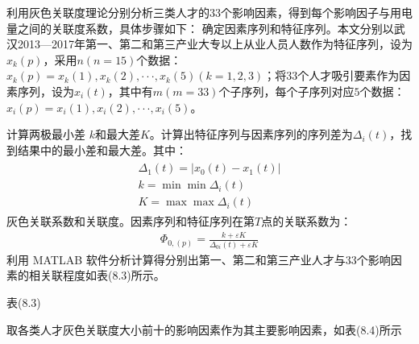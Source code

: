 \documentclass{whutmod}
\begin{document}
	利用灰色关联度理论分别分析三类人才的$33$个影响因素，得到每个影响因子与用电量之间的关联度系数，具体步骤如下：
	确定因素序列和特征序列。本文分别以武汉2013—2017年第一、第二和第三产业大专以上从业人员人数作为特征序列，设为$x_{k}(p)$，采用$n(n=15)$个数据：$x_{k}(p)={x_{k}(1),x_{k}(2),···,x_{k}(5)}(k=1,2,3)$；将$33$个人才吸引要素作为因素序列，设为$x_{i}(t)$，其中有$m(m=33)$个子序列，每个子序列对应$5$个数据：$x_{i}(p)={x_{i}(1),x_{i}(2),···,x_{i}(5)}$。
	
	计算两极最小差 $k$和最大差$K$。计算出特征序列与因素序列的序列差为$\Delta _{i}(t)$，找到结果中的最小差和最大差。其中：
	\begin{gather}
	\begin{array} { l } { \Delta _ { 1 } ( t ) = \left| x _ { 0 } ( t ) - x _ { 1 } ( t ) \right| } \\ { k = \min \min \Delta _ { i } ( t ) } \\ { K = \max \max \Delta _ { i } ( t ) } \end{array}
	\end{gather}
	灰色关联系数和关联度。因素序列和特征序列在第$T$点的关联系数为：
	\begin{gather}
	\Phi _ { 0 , ( p ) } = \frac { k + \varepsilon K } { \Delta _ { 0 i } ( t ) + \varepsilon K }
	\end{gather}
	利用 MATLAB 软件分析计算得分别出第一、第二和第三产业人才与$33$个影响因素的相关联程度如表(8.3)所示。
	
	表(8.3)
	
	取各类人才灰色关联度大小前十的影响因素作为其主要影响因素，如表(8.4)所示
\end{document}
